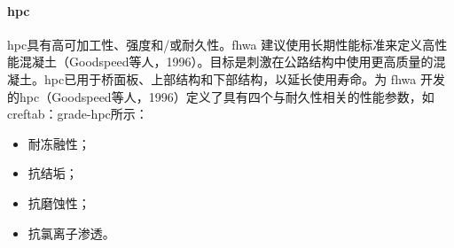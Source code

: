 \paragraph{\acrfull*{hpc}}
\acrlong*{hpc}具有高可加工性、强度和/或耐久性。\gls*{fhwa} 建议使用长期性能标准来定义高性能混凝土（Goodspeed等人，1996）。目标是刺激在公路结构中使用更高质量的混凝土。\acrlong*{hpc}已用于桥面板、上部结构和下部结构，以延长使用寿命。为 \gls*{fhwa} 开发的\acrlong*{hpc}（Goodspeed等人，1996）定义了具有四个与耐久性相关的性能参数，如cref{tab：grade-hpc}所示：
\begin{itemize}
  \item 耐冻融性；
  \item 抗结垢；
  \item 抗磨蚀性；
  \item 抗氯离子渗透。
\end{itemize}

